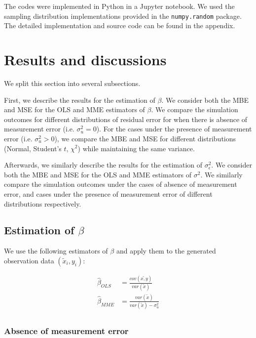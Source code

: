 \documentclass{article}
\begin{document}
The codes were implemented in Python in a Jupyter notebook. We used the sampling distribution implementations provided in the \verb|numpy.random| package. The detailed implementation and source code can be found in the appendix.

\section{Results and discussions}

We split this section into several subsections.

First, we describe the results for the estimation of $\beta$.
We consider both the MBE and MSE for the OLS and MME estimators of $\beta$. 
We compare the simulation outcomes for different distributions of residual error for when there is absence of measurement error (i.e. $\sigma^2_u = 0$).
For the cases under the presence of measurement error (i.e. $\sigma^2_u > 0$), we compare the MBE and MSE for different distributions (Normal, Student's $t$, $\chi^2$) while maintaining the same variance.

Afterwards, we similarly describe the results for the estimation of $\sigma^2_\epsilon$.
We consider both the MBE and MSE for the OLS and MME estimators of $\sigma^2$.
We similarly compare the simulation outcomes under the cases of absence of measurement error, and cases under the presence of measurement error of different distributions respectively.

\subsection{Estimation of $\beta$}

We use the following estimators of $\beta$ and apply them to the generated observation data $(\tilde{x}_i, y_i)$:

\begin{equation}
    \begin{split}
        \hat{\beta}_{OLS} &= \frac{cov(\tilde{x, y})}{var(\tilde{x})}\\
        \hat{\beta}_{MME} &= \frac{var(\tilde{x})}{var(\tilde{x}) - \sigma^2_u}\\
    \end{split}
\end{equation}

\subsubsection{Absence of measurement error}
\end{document}
